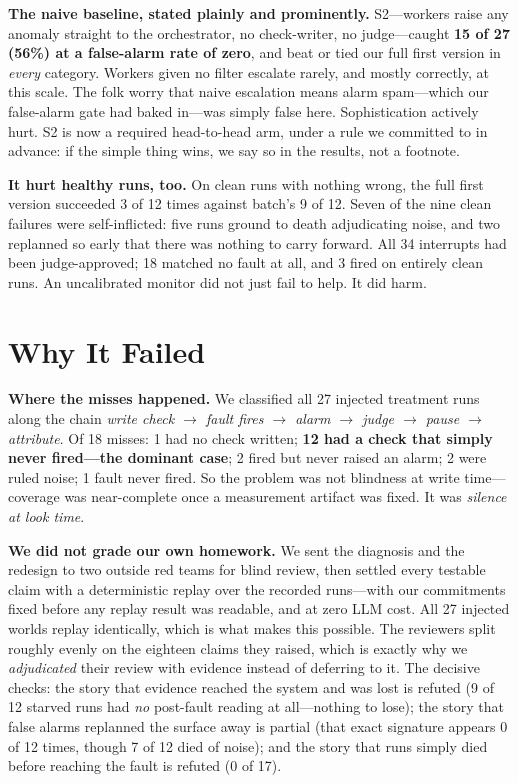 \documentclass[acmsmall,screen]{acmart}
\begin{document}
\textbf{The naive baseline, stated plainly and prominently.} S2---workers raise
any anomaly straight to the orchestrator, no check-writer, no judge---caught
\textbf{15 of 27 (56\%) at a false-alarm rate of zero}, and beat or tied our
full first version in \emph{every} category. Workers given no filter escalate
rarely, and mostly correctly, at this scale. The folk worry that naive
escalation means alarm spam---which our false-alarm gate had baked in---was
simply false here. Sophistication actively hurt. S2 is now a required
head-to-head arm, under a rule we committed to in advance: if the simple thing
wins, we say so in the results, not a footnote.

\textbf{It hurt healthy runs, too.} On clean runs with nothing wrong, the full
first version succeeded 3 of 12 times against batch's 9 of 12. Seven of the nine
clean failures were self-inflicted: five runs ground to death adjudicating
noise, and two replanned so early that there was nothing to carry forward. All
34 interrupts had been judge-approved; 18 matched no fault at all, and 3 fired
on entirely clean runs. An uncalibrated monitor did not just fail to help. It
did harm.

\section{Why It Failed}
\textbf{Where the misses happened.} We classified all 27 injected treatment
runs along the chain \emph{write check $\rightarrow$ fault fires $\rightarrow$
alarm $\rightarrow$ judge $\rightarrow$ pause $\rightarrow$ attribute}. Of 18
misses: 1 had no check written; \textbf{12 had a check that simply never
fired---the dominant case}; 2 fired but never raised an alarm; 2 were ruled
noise; 1 fault never fired. So the problem was not blindness at write
time---coverage was near-complete once a measurement artifact was fixed. It was
\emph{silence at look time}.

\textbf{We did not grade our own homework.} We sent the diagnosis and the
redesign to two outside red teams for blind review, then settled every testable
claim with a deterministic replay over the recorded runs---with our commitments
fixed before any replay result was readable, and at zero LLM cost. All 27
injected worlds replay identically, which is what makes this possible. The
reviewers split roughly evenly on the eighteen claims they raised, which is
exactly why we \emph{adjudicated} their review with evidence instead of
deferring to it. The decisive checks: the story that evidence reached the system
and was lost is refuted (9 of 12 starved runs had \emph{no} post-fault reading
at all---nothing to lose); the story that false alarms replanned the surface
away is partial (that exact signature appears 0 of 12 times, though 7 of 12 died
of noise); and the story that runs simply died before reaching the fault is
refuted (0 of 17).
\end{document}
